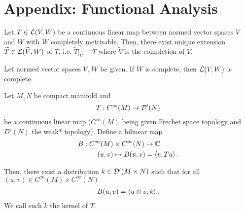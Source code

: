 \documentclass{article}
\begin{document}
\pagebreak
\section{Appendix: Functional Analysis}

\begin{ftheorem}
    Let $T \in \L(V, W)$ be a continuous linear map between normed vector spaces $V$ and $W$ with $W$ completely metrisable. Then, there exist unique extension $\widetilde{T} \in \L(\widetilde{V}, W)$ of $T$, i.e. $\widetilde{T}|_V = T$ where $\widetilde{V}$ is the completion of $V$. 
\end{ftheorem}

\begin{ftheorem}
    Let normed vector spaces $V$, $W$ be given. If $W$ is complete, then  $\L(V, W)$ is complete. 
\end{ftheorem}

\begin{ftheorem} 
    Let $M, N$ be compact manifold and 
    \begin{align*}
    T: C^\infty(M) \to \D'(N) \\
    \end{align*}
    be a continuous linear map ($C^\infty(M)$ being given Frechet space topology and $D'(N)$ the weak* topology). Define a bilinear map 
    \begin{align*}
    B: C^\infty(M) &\times C^\infty(N) \to \C \\
    (u, v) &\mapsto B(u, v) = \inprod[v, Tu]. 
    \end{align*}
    
    Then, there exist a distribution $k \in \D'(M \times N)$ such that for all $(u, v) \in C^\infty(M) \times C^\infty(N)$
    \begin{align*}
    B(u, v) = \inprod[u \otimes v, k]. 
    \end{align*}
    We call such $k$ the kernel of $T$. 
\end{ftheorem}

\begin{fdefinition}
    
    
\end{fdefinition}
%

\end{document}
